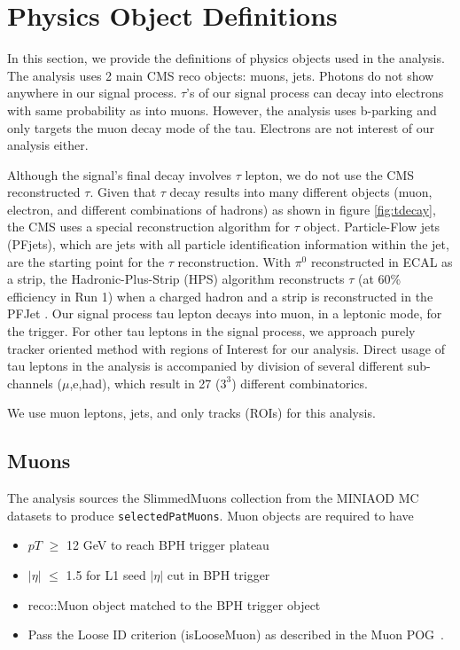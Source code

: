 \clearpage
\chapter{Physics Object Definitions}\label{sec:objects}

In this section, we provide the definitions of physics objects used in the analysis.
The analysis uses 2 main CMS reco objects: muons, jets.
Photons do not show anywhere in our signal process.
$\tau$'s of our signal process can decay into electrons with same probability as into muons. 
However, the analysis uses b-parking and only targets the muon decay mode of the tau.
Electrons are not interest of our analysis either.

Although the signal's final decay involves $\tau$ lepton, we do not use the CMS reconstructed $\tau$.
Given that $\tau$ decay results into many different objects (muon, electron, and different combinations of hadrons) as shown in figure \ref{fig:tdecay}, the CMS uses a special reconstruction algorithm for $\tau$ object.
Particle-Flow jets (PFjets), which are jets with all particle identification information within the jet, are the starting point for the $\tau$ reconstruction.
With $\pi^{0}$ reconstructed in ECAL as a strip, the Hadronic-Plus-Strip (HPS) algorithm reconstructs $\tau$ (at 60\% efficiency in Run 1) when a charged hadron and a strip is reconstructed in the PFJet \cite{HPS}.
Our signal process tau lepton decays into muon, in a leptonic mode, for the trigger.
For other tau leptons in the signal process, we approach purely tracker oriented method with regions of Interest for our analysis.
Direct usage of tau leptons in the analysis is accompanied by division of several different sub-channels ($\mu$,e,had), which result in 27 ($3^{3}$) different combinatorics. 

We use muon leptons, jets, and only tracks (ROIs) for this analysis.
\section{Muons}\label{sec:muons}
The analysis sources the SlimmedMuons collection from the MINIAOD MC datasets to produce {\tt selectedPatMuons}.
Muon objects are required to have 
\begin{itemize}
  \item $pT$ $\geq$ 12 GeV to reach BPH trigger plateau
  \item $|\eta|$ $\leq$ 1.5 for L1 seed $|\eta|$ cut in BPH trigger
  \item reco::Muon object matched to the BPH trigger object
  \item Pass the Loose ID criterion (isLooseMuon) as described in the Muon POG~\cite{muonpog}.
\end{itemize}

